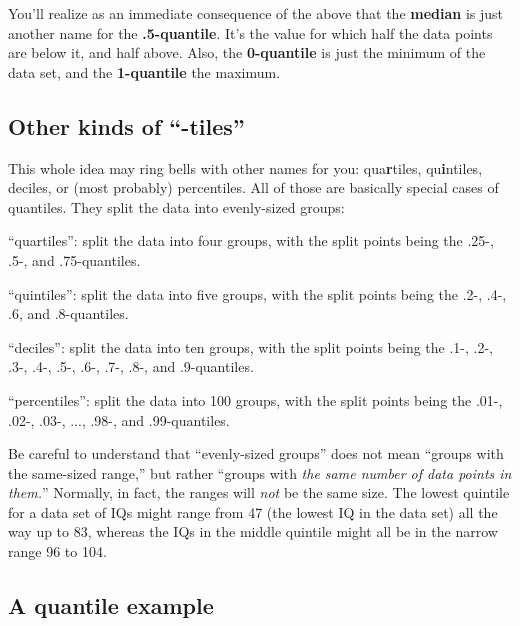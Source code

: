 
You'll realize as an immediate consequence of the above that the
\textbf{median} is just another name for the \textbf{.5-quantile}. It's the
value for which half the data points are below it, and half above. Also, the
\textbf{0-quantile} is just the minimum of the data set, and the
\textbf{1-quantile} the maximum.

\subsection{Other kinds of ``-tiles''}

This whole idea may ring bells with other names for you: qua\textbf{r}tiles,
qu\textbf{i}ntiles, deciles, or (most probably) percentiles. All of those are
basically special cases of quantiles. They split the data into evenly-sized
groups:


\begin{compactitem}
\item ``quartiles'': split the data into four groups, with the split points
being the .25-, .5-, and .75-quantiles.
\item ``quintiles'': split the data into five groups, with the split points
being the .2-, .4-, .6, and .8-quantiles.
\item ``deciles'': split the data into ten groups, with the split points
being the .1-, .2-, .3-, .4-, .5-, .6-, .7-, .8-, and .9-quantiles.
\item ``percentiles'': split the data into 100 groups, with the split points
being the .01-, .02-, .03-, ..., .98-, and .99-quantiles.
\end{compactitem}

Be careful to understand that ``evenly-sized groups'' does not mean ``groups
with the same-sized range,'' but rather ``groups with \textit{the same number
of data points in them.}'' Normally, in fact, the ranges will \textit{not} be
the same size. The lowest quintile for a data set of IQs might range from 47
(the lowest IQ in the data set) all the way up to 83, whereas the IQs in the
middle quintile might all be in the narrow range 96 to 104.

\subsection{A quantile example}

